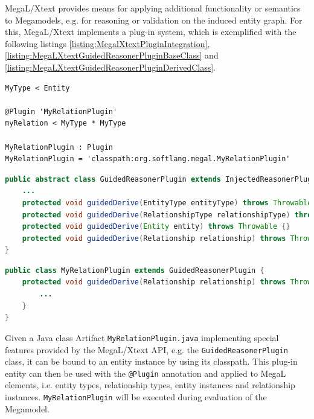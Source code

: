 \Gls{MegaL/Xtext} provides means for applying additional functionality or semantics to \glspl{Megamodel}, e.g. for reasoning or validation on the induced entity graph.
For this, \gls{MegaL/Xtext} implements a plug-in system, which is exemplified with the following listings \ref{listing:MegalXtextPluginIntegration}, \ref{listing:MegaLXtextGuidedReasonerPluginBaseClass} and \ref{listing:MegaLXtextGuidedReasonerPluginDerivedClass}.
\begin{lstlisting}[caption={MegaL/Xtext Plugin Integration},label={listing:MegalXtextPluginIntegration}]
MyType < Entity

@Plugin 'MyRelationPlugin'
myRelation < MyType * MyType

MyRelationPlugin : Plugin
MyRelationPlugin = 'classpath:org.softlang.megal.MyRelationPlugin'
\end{lstlisting}
\begin{lstlisting}[language=Java,caption={MegaL/Xtext GuidedReasonerPlugin base class},label={listing:MegaLXtextGuidedReasonerPluginBaseClass}]
public abstract class GuidedReasonerPlugin extends InjectedReasonerPlugin {
	...
	protected void guidedDerive(EntityType entityType) throws Throwable {}
	protected void guidedDerive(RelationshipType relationshipType) throws Throwable {}
	protected void guidedDerive(Entity entity) throws Throwable {}
	protected void guidedDerive(Relationship relationship) throws Throwable {}
}
\end{lstlisting}
\begin{lstlisting}[language=Java,caption={MegaL/Xtext GuidedReasonerPlugin derived class},label={listing:MegaLXtextGuidedReasonerPluginDerivedClass}]
public class MyRelationPlugin extends GuidedReasonerPlugin {
	protected void guidedDerive(Relationship relationship) throws Throwable {
		...
	}
}
\end{lstlisting}
Given a \gls{Java} class \gls{Artifact} \texttt{MyRelationPlugin.java} implementing special features provided by the \gls{MegaL/Xtext} \gls{API}, e.g. the \texttt{GuidedReasonerPlugin} class, it can be bound to an entity instance by using its classpath.
This plug-in entity can then be used with the \texttt{@Plugin} annotation and applied to \gls{MegaL} elements, i.e. entity types, relationship types, entity instances and relationship instances.
\texttt{MyRelationPlugin} will be executed during evaluation of the \gls{Megamodel}.


